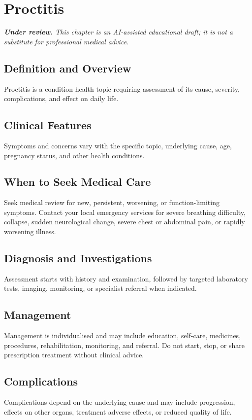 \chapter{Proctitis}

\medskip
\noindent\textit{\textbf{Under review.} This chapter is an AI-assisted educational draft; it is not a substitute for professional medical advice.}

\section*{Definition and Overview}
Proctitis is a condition health topic requiring assessment of its cause, severity, complications, and effect on daily life.

\section*{Clinical Features}
Symptoms and concerns vary with the specific topic, underlying cause, age, pregnancy status, and other health conditions.

\section*{When to Seek Medical Care}
Seek medical review for new, persistent, worsening, or function-limiting symptoms. Contact your local emergency services for severe breathing difficulty, collapse, sudden neurological change, severe chest or abdominal pain, or rapidly worsening illness.

\section*{Diagnosis and Investigations}
Assessment starts with history and examination, followed by targeted laboratory tests, imaging, monitoring, or specialist referral when indicated.

\section*{Management}
Management is individualised and may include education, self-care, medicines, procedures, rehabilitation, monitoring, and referral. Do not start, stop, or share prescription treatment without clinical advice.

\section*{Complications}
Complications depend on the underlying cause and may include progression, effects on other organs, treatment adverse effects, or reduced quality of life.


